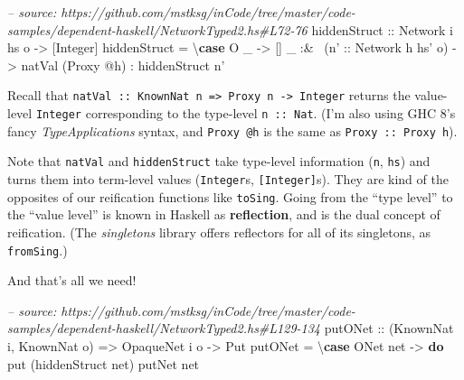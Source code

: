 \documentclass[]{article}
\newenvironment{Shaded}{}{}
\newcommand{\KeywordTok}[1]{\textcolor[rgb]{0.00,0.44,0.13}{\textbf{{#1}}}}
\newcommand{\DataTypeTok}[1]{\textcolor[rgb]{0.56,0.13,0.00}{{#1}}}
\newcommand{\CommentTok}[1]{\textcolor[rgb]{0.38,0.63,0.69}{\textit{{#1}}}}
\newcommand{\OtherTok}[1]{\textcolor[rgb]{0.00,0.44,0.13}{{#1}}}
\newcommand{\FunctionTok}[1]{\textcolor[rgb]{0.02,0.16,0.49}{{#1}}}
\newcommand{\NormalTok}[1]{{#1}}
\begin{document}
\begin{Shaded}
\begin{Highlighting}[]
\CommentTok{-- source: https://github.com/mstksg/inCode/tree/master/code-samples/dependent-haskell/NetworkTyped2.hs#L72-76}
\OtherTok{hiddenStruct ::} \DataTypeTok{Network} \NormalTok{i hs o }\OtherTok{->} \NormalTok{[}\DataTypeTok{Integer}\NormalTok{]}
\NormalTok{hiddenStruct }\FunctionTok{=} \NormalTok{\textbackslash{}}\KeywordTok{case} \DataTypeTok{O} \NormalTok{_    }\OtherTok{->} \NormalTok{[]}
                     \NormalTok{_ }\FunctionTok{:&~} \NormalTok{(}\OtherTok{n' ::} \DataTypeTok{Network} \NormalTok{h hs' o)}
                            \OtherTok{->} \NormalTok{natVal (}\DataTypeTok{Proxy} \FunctionTok{@}\NormalTok{h)}
                             \FunctionTok{:} \NormalTok{hiddenStruct n'}
\end{Highlighting}
\end{Shaded}

Recall that
\texttt{natVal\ ::\ KnownNat\ n\ =\textgreater{}\ Proxy\ n\ -\textgreater{}\ Integer}
returns the value-level \texttt{Integer} corresponding to the type-level
\texttt{n\ ::\ Nat}. (I'm also using GHC 8's fancy \emph{TypeApplications}
syntax, and \texttt{Proxy\ @h} is the same as \texttt{Proxy\ ::\ Proxy\ h}).

Note that \texttt{natVal} and \texttt{hiddenStruct} take type-level information
(\texttt{n}, \texttt{hs}) and turns them into term-level values
(\texttt{Integer}s, \texttt{{[}Integer{]}}s). They are kind of the opposites of
our reification functions like \texttt{toSing}. Going from the ``type level'' to
the ``value level'' is known in Haskell as \textbf{reflection}, and is the dual
concept of reification. (The \emph{singletons} library offers reflectors for all
of its singletons, as \texttt{fromSing}.)

And that's all we need!

\begin{Shaded}
\begin{Highlighting}[]
\CommentTok{-- source: https://github.com/mstksg/inCode/tree/master/code-samples/dependent-haskell/NetworkTyped2.hs#L129-134}
\OtherTok{putONet ::} \NormalTok{(}\DataTypeTok{KnownNat} \NormalTok{i, }\DataTypeTok{KnownNat} \NormalTok{o)}
        \OtherTok{=>} \DataTypeTok{OpaqueNet} \NormalTok{i o}
        \OtherTok{->} \DataTypeTok{Put}
\NormalTok{putONet }\FunctionTok{=} \NormalTok{\textbackslash{}}\KeywordTok{case} \DataTypeTok{ONet} \NormalTok{net }\OtherTok{->} \KeywordTok{do}
                  \NormalTok{put (hiddenStruct net)}
                  \NormalTok{putNet net}
\end{Highlighting}
\end{Shaded}
\end{document}
